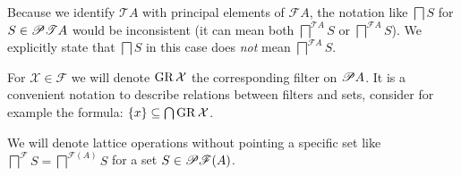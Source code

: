 Because we identify $\mathscr{T}A$ with principal elements of $\mathscr{F}A$,
the notation like $\bigsqcap S$ for $S\in\mathscr{P}\mathscr{T}A$ would
be inconsistent (it can mean both $\bigsqcap^{\mathscr{T}A}S$ or
$\bigsqcap^{\mathscr{F}A}S$). We explicitly state that $\bigsqcap S$
in this case does \emph{not} mean $\bigsqcap^{\mathscr{F}A}S$.

For $\mathcal{X}\in\mathscr{F}$ we will denote $\operatorname{GR}\mathcal{X}$
the corresponding filter on $\mathscr{P} A$. It is a convenient notation
to describe relations between filters and sets, consider for example
the formula: $\{x\}\subseteq\bigcap\operatorname{GR}\mathcal{X}$.

We will denote lattice operations without pointing a specific set
like $\bigsqcap^{\mathscr{F}}S=\bigsqcap^{\mathscr{F}(A)}S$ for a
set $S\in\mathscr{P}\mathscr{F}(A)$.

